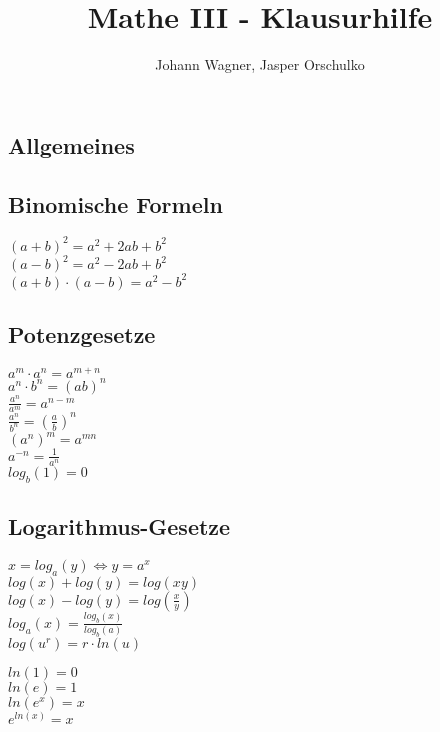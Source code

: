 \documentclass[a4paper, landscape, 10pt]{article}
\author{Johann Wagner, Jasper Orschulko}
\title{Mathe III - Klausurhilfe}
\begin{document}
    \begin{multicols}{4}
        
    
    \begin{small}
    \section{Allgemeines}
	    \subsection{Binomische Formeln}
		    $(a+b)^{2}=a^{2}+2ab+b^{2}$\\
		    $(a-b)^{2}=a^{2}-2ab+b^{2}$\\
		    $(a+b)\cdot(a-b)=a^{2}-b^{2}$
        \subsection{Potenzgesetze}
            \begin{multicols}{2}
            $a^m \cdot a^n = a^{m+n}$\\
            $a^n \cdot b^n = (ab)^n$\\
            $\frac{a^n}{a^m} = a^{n-m}$\\
            $\frac{a^n}{b^n} = \left(\frac{a}{b}\right)^n$\\
            $(a^n)^m = a^{mn}$\\
            $a^{-n} = \frac{1}{a^n}$\\
            $log_b(1) = 0$
            \end{multicols}
         \subsection{Logarithmus-Gesetze}
            \noindent
            $x = log_a(y) \Leftrightarrow y = a^x$\\
            $log(x) + log(y) = log(xy)$\\
            $log(x) - log(y) = log(\frac{x}{y})$\\
            $log_a(x) = \frac{log_b(x)}{log_b(a)}$  \\
            $log(u^r) = r \cdot ln(u)$
            \begin{multicols}{2}
            \noindent
            $ln(1) = 0$ \\
            $ln(e) = 1$ \\
            $ln(e^x) = x$ \\
            $e^{ln(x)} = x$
            \end{multicols}

\end{small}
\end{multicols}
\end{document}
